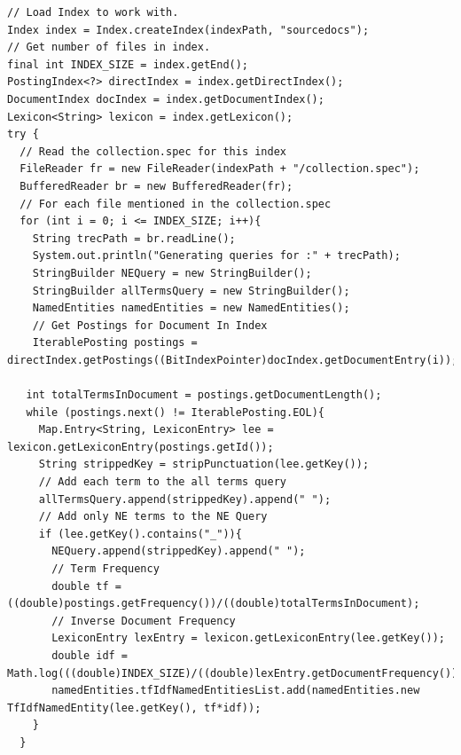 \documentclass{l4proj}
\newenvironment{codelisting}{\captionsetup{type=listing}}{}
\begin{document}
\begin{codelisting}
\begin{verbatim}
// Load Index to work with.
Index index = Index.createIndex(indexPath, "sourcedocs");
// Get number of files in index.
final int INDEX_SIZE = index.getEnd();
PostingIndex<?> directIndex = index.getDirectIndex();
DocumentIndex docIndex = index.getDocumentIndex();
Lexicon<String> lexicon = index.getLexicon();
try {
  // Read the collection.spec for this index
  FileReader fr = new FileReader(indexPath + "/collection.spec");
  BufferedReader br = new BufferedReader(fr);
  // For each file mentioned in the collection.spec
  for (int i = 0; i <= INDEX_SIZE; i++){
    String trecPath = br.readLine();
	System.out.println("Generating queries for :" + trecPath);
	StringBuilder NEQuery = new StringBuilder();
	StringBuilder allTermsQuery = new StringBuilder();
	NamedEntities namedEntities = new NamedEntities();
	// Get Postings for Document In Index
	IterablePosting postings = directIndex.getPostings((BitIndexPointer)docIndex.getDocumentEntry(i));
				
   int totalTermsInDocument = postings.getDocumentLength();
   while (postings.next() != IterablePosting.EOL){
     Map.Entry<String, LexiconEntry> lee = lexicon.getLexiconEntry(postings.getId());
     String strippedKey = stripPunctuation(lee.getKey());
     // Add each term to the all terms query
	 allTermsQuery.append(strippedKey).append(" ");
	 // Add only NE terms to the NE Query 
	 if (lee.getKey().contains("_")){
	   NEQuery.append(strippedKey).append(" ");
       // Term Frequency
       double tf = ((double)postings.getFrequency())/((double)totalTermsInDocument);
       // Inverse Document Frequency
	   LexiconEntry lexEntry = lexicon.getLexiconEntry(lee.getKey());
	   double idf = Math.log(((double)INDEX_SIZE)/((double)lexEntry.getDocumentFrequency()));
       namedEntities.tfIdfNamedEntitiesList.add(namedEntities.new TfIdfNamedEntity(lee.getKey(), tf*idf));
    }
  }
\end{verbatim}
\label{code:query_generation}
\end{codelisting}
\end{document}
